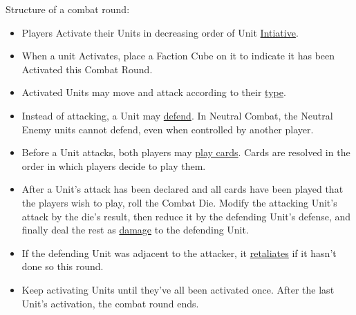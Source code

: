 Structure of a combat round:
\begin{itemize}
  \item Players Activate their Units in decreasing order of Unit \hyperlink{Initiative}{Intiative}.
  \item When a unit Activates, place a Faction Cube on it to indicate it has been Activated this Combat Round.
  \item Activated Units may move and attack according to their \hyperlink{Unittype}{type}.
  \item Instead of attacking, a Unit may \hyperlink{Defend}{defend}.
  In Neutral Combat, the Neutral Enemy units cannot defend, even when controlled by another player.
  \item Before a Unit attacks, both players may \hyperlink{CombatCards}{play cards}. Cards are resolved in the order in which players decide to play them.
  \item After a Unit's attack has been declared and all cards have been played that the players wish to play, roll the Combat Die.
    Modify the attacking Unit's attack by the die's result, then reduce it by the defending Unit's defense, and finally deal the rest as \hyperlink{HP}{damage} to the defending Unit.
  \item If the defending Unit was adjacent to the attacker, it \hyperlink{Retaliate}{retaliates} if it hasn't done so this round.
  \item Keep activating Units until they've all been activated once.
After the last Unit's activation, the combat round ends.
\end{itemize}
